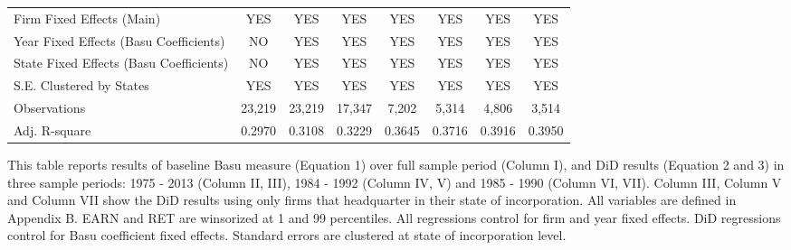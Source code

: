 \begin{landscape}
\begin{table}[H]
\begin{tabular}{lccccccc}
			Firm Fixed Effects (Main) & YES   & YES   & YES   & YES   & YES   & YES   & YES \\
			Year Fixed Effects (Basu Coefficients) & NO    & YES   & YES   & YES   & YES   & YES   & YES \\
			State Fixed Effects (Basu Coefficients) & NO    & YES   & YES   & YES   & YES   & YES   & YES \\
			S.E. Clustered by States & YES   & YES   & YES   & YES   & YES   & YES   & YES \\
			Observations  & 23,219 &                  23,219  &                  17,347  &                     7,202  &                     5,314  &                     4,806  &                    3,514  \\
			Adj. R-square & 0.2970 & 0.3108 & 0.3229 & 0.3645 & 0.3716 & 0.3916 & 0.3950 \\
			\bottomrule
			\bottomrule
		\end{tabular}%
	\end{table}%
	
	\noindent This table reports results of baseline Basu measure (Equation 1) over full sample period (Column I), and DiD results (Equation 2 and 3) in three sample periods: 1975 - 2013 (Column II, III), 1984 - 1992 (Column IV, V) and 1985 - 1990 (Column VI, VII). Column III, Column V and Column VII show the DiD results using only firms that headquarter in their state of incorporation. All variables are defined in Appendix B. EARN and RET are winsorized at 1 and 99 percentiles. All regressions control for firm and year fixed effects. DiD regressions control for Basu coefficient fixed effects. Standard errors are clustered at state of incorporation level. %
	
\end{landscape}
\restoregeometry

